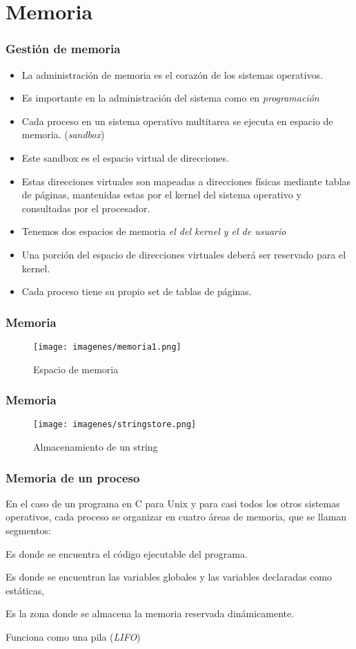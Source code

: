 \documentclass{beamer}
\begin{document}
\section{Memoria}
\begin{frame}
\frametitle{Gestión de memoria}
\begin{itemize}[<+->]
\item La administración de memoria es el corazón de los sistemas operativos. 
\item Es importante en la administración del sistema como en \emph{programación}
\item Cada proceso en un sistema operativo multitarea se ejecuta en espacio de memoria. (\emph{sandbox})
\item Este sandbox es el espacio virtual de direcciones.
\item  Estas direcciones virtuales son mapeadas a direcciones físicas mediante tablas de páginas, mantenidas estas por el kernel del sistema operativo y consultadas por el procesador. 
\item Tenemos dos espacios de memoria \emph{el del kernel y el de usuario} 
\item Una porción del espacio de direcciones virtuales deberá ser reservado para el kernel. 
\item Cada proceso tiene su propio set de tablas de páginas.
\end{itemize} 
\end{frame}

\begin{frame}
\frametitle{Memoria} 
\begin{figure}
\texttt{[image: imagenes/memoria1.png]} 
\caption{Espacio de memoria}
\end{figure} 
\end{frame}

\begin{frame}
\frametitle{Memoria} 
\begin{figure}
\texttt{[image: imagenes/stringstore.png]}
\caption{Almacenamiento de un string}
\end{figure} 
\end{frame}

\begin{frame}
\frametitle{Memoria de un proceso}
En el caso de un programa en C para Unix y para casi todos los otros sistemas operativos, cada proceso se organizar en cuatro áreas de memoria, que se llaman segmentos:\pause
\begin{description}[<+->]
\item[Segmento de código] Es donde se encuentra el código ejecutable del programa. 
\item[Segmento de datos] Es donde se encuentran las variables globales y las variables declaradas como estáticas,
\item[El montón o heap]  Es la zona donde se almacena la memoria reservada dinámicamente.  
\item[La pila o stack] Funciona como una pila (\emph{LIFO})   
\end{description} 
\end{frame}
\end{document}
